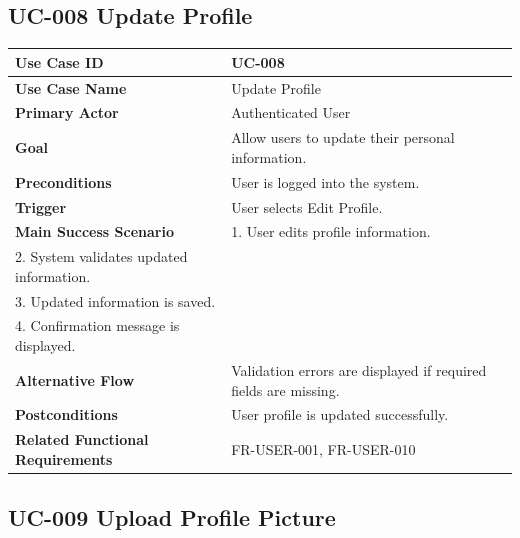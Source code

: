 \subsection{UC-008 Update Profile}

\begin{longtable}{|p{4cm}|p{10cm}|}

\hline
\textbf{Use Case ID} &
UC-008 \\
\hline

\textbf{Use Case Name} &
Update Profile \\
\hline

\textbf{Primary Actor} &
Authenticated User \\
\hline

\textbf{Goal} &
Allow users to update their personal information. \\
\hline

\textbf{Preconditions} &
User is logged into the system. \\
\hline

\textbf{Trigger} &
User selects Edit Profile. \\
\hline

\textbf{Main Success Scenario} &
1. User edits profile information.\\
2. System validates updated information.\\
3. Updated information is saved.\\
4. Confirmation message is displayed.\\
\hline

\textbf{Alternative Flow} &
Validation errors are displayed if required fields are missing.\\
\hline

\textbf{Postconditions} &
User profile is updated successfully.\\
\hline

\textbf{Related Functional Requirements} &
FR-USER-001, FR-USER-010 \\
\hline

\end{longtable}

\subsection{UC-009 Upload Profile Picture}

